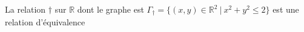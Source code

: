 La relation $\dagger$ sur $\mathbb R$ dont le graphe est $\Gamma_\dagger=\{(x,y)\in\mathbb R^2\:|\: x^2+y^2\leq 2\}$ est une relation d'équivalence

\begin{reponses}
\end{reponses}

